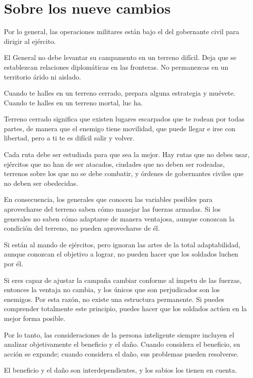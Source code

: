 \chapter{Sobre los nueve cambios}

Por lo general, las operaciones militares están bajo el del gobernante civil para dirigir al ejército.

El General no debe levantar su campamento en un terreno difícil. Deja que se establezcan relaciones diplomáticas en las fronteras. No permanezcas en un territorio árido ni aislado.

Cuando te halles en un terreno cerrado, prepara alguna estrategia y muévete. Cuando te halles en un terreno mortal, luc ha.

Terreno cerrado significa que existen lugares escarpados que te rodean por todas partes, de manera que el enemigo tiene movilidad, que puede llegar e irse con libertad, pero a ti te es difícil salir y volver.

Cada ruta debe ser estudiada para que sea la mejor. Hay rutas que no debes usar, ejércitos que no han de ser atacados, ciudades que no deben ser rodeadas, terrenos sobre los que no se debe combatir, y órdenes de gobernantes civiles que no deben ser obedecidas.

En consecuencia, los generales que conocen las variables posibles para aprovecharse del terreno saben cómo manejar las fuerzas armadas. Si los generales no saben cómo adaptarse de manera ventajosa, aunque conozcan la condición del terreno, no pueden aprovecharse de él.

Si están al mando de ejércitos, pero ignoran las artes de la total adaptabilidad, aunque conozcan el objetivo a lograr, no pueden hacer que los soldados luchen por él.

Si eres capaz de ajustar la campaña cambiar conforme al ímpetu de las fuerzas, entonces la ventaja no cambia, y los únicos que son perjudicados son los enemigos. Por esta razón, no existe una estructura permanente. Si puedes comprender totalmente este principio, puedes hacer que los soldados actúen en la mejor forma posible.

Por lo tanto, las consideraciones de la persona inteligente siempre incluyen el analizar objetivamente el beneficio y el daño. Cuando considera el beneficio, su acción se expande; cuando considera el daño, sus problemas pueden resolverse.

El beneficio y el daño son interdependientes, y los sabios los tienen en cuenta.

